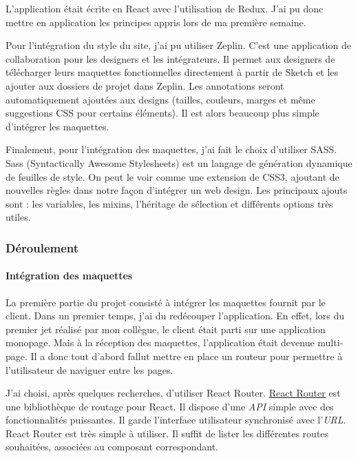 L'application était écrite en React avec l'utilisation de Redux. J'ai pu
donc mettre en application les principes appris lors de ma première
semaine.

\bigskip

Pour l'intégration du style du site, j'ai pu utiliser Zeplin. C'est une
application de collaboration pour les designers et les intégrateurs. Il
permet aux designers de télécharger leurs maquettes fonctionnelles
directement à partir de Sketch et les ajouter aux dossiers de projet
dans Zeplin. Les annotations seront automatiquement ajoutées aux designs
(tailles, couleurs, marges et même suggestions CSS pour certains
éléments). Il est alors beaucoup plus simple d'intégrer les maquettes.

\bigskip

Finalement, pour l'intégration des maquettes, j'ai fait le choix
d'utiliser SASS. Sass (Syntactically Awesome Stylesheets) est un langage
de génération dynamique de feuilles de style. On peut le voir comme une
extension de CSS3, ajoutant de nouvelles règles dans notre façon
d'intégrer un web design. Les principaux ajouts sont : les variables,
les mixins, l'héritage de sélection et différents options très utiles.

\bigskip

\subsubsection{Déroulement}\label{duxe9roulement}

\bigskip

\paragraph{Intégration des
maquettes}\label{intuxe9gration-des-maquettes}

\bigskip

La première partie du projet consisté à intégrer les maquettes fournit
par le client. Dans un premier temps, j'ai du redécouper l'application.
En effet, lors du premier jet réalisé par mon collègue, le client était
parti sur une application monopage. Mais à la réception des maquettes,
l'application était devenue multi-page. Il a donc tout d'abord fallut
mettre en place un routeur pour permettre à l'utilisateur de naviguer
entre les pages.

\bigskip

J'ai choisi, après quelques recherches, d'utiliser React Router.
\href{https://github.com/ReactTraining/react-router}{React Router} est
une bibliothèque de routage pour React. Il dispose d'une \emph{API}
simple avec des fonctionnalités puissantes. Il garde l'interface
utilisateur synchronisé avec l'\emph{URL}. React Router est très simple
à utiliser. Il suffit de lister les différentes routes souhaitées,
associées au composant correspondant.

